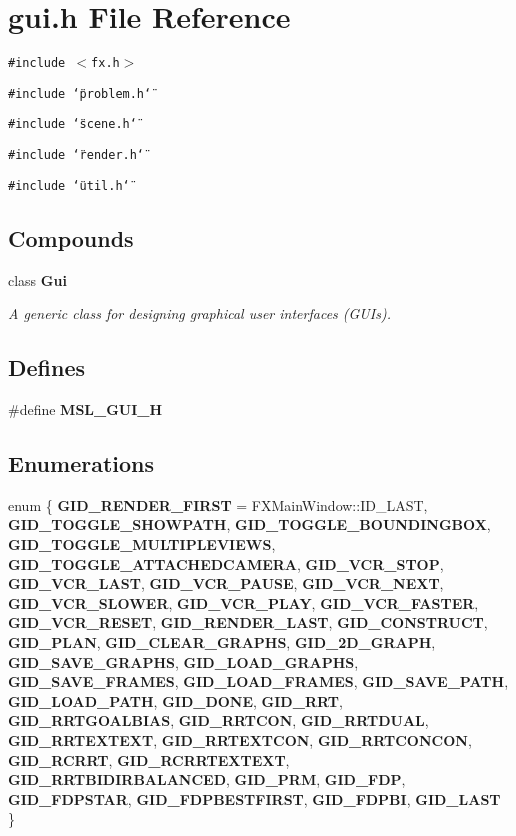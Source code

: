 \section{gui.h File Reference}
\label{gui_8h}
{\tt \#include $<$fx.h$>$}\par
{\tt \#include \char`\"{}problem.h\char`\"{}}\par
{\tt \#include \char`\"{}scene.h\char`\"{}}\par
{\tt \#include \char`\"{}render.h\char`\"{}}\par
{\tt \#include \char`\"{}util.h\char`\"{}}\par
\subsection*{Compounds}
\begin{CompactItemize}
\item 
class {\bf Gui}
\begin{CompactList}\small\item\em A generic class for designing graphical user interfaces (GUIs).\item\end{CompactList}\end{CompactItemize}
\subsection*{Defines}
\begin{CompactItemize}
\item 
\#define {\bf MSL\_\-GUI\_\-H}
\end{CompactItemize}
\subsection*{Enumerations}
\begin{CompactItemize}
\item 
enum \{ {\bf GID\_\-RENDER\_\-FIRST} =  FXMain\-Window::ID\_\-LAST, 
{\bf GID\_\-TOGGLE\_\-SHOWPATH}, 
{\bf GID\_\-TOGGLE\_\-BOUNDINGBOX}, 
{\bf GID\_\-TOGGLE\_\-MULTIPLEVIEWS}, 
{\bf GID\_\-TOGGLE\_\-ATTACHEDCAMERA}, 
{\bf GID\_\-VCR\_\-STOP}, 
{\bf GID\_\-VCR\_\-LAST}, 
{\bf GID\_\-VCR\_\-PAUSE}, 
{\bf GID\_\-VCR\_\-NEXT}, 
{\bf GID\_\-VCR\_\-SLOWER}, 
{\bf GID\_\-VCR\_\-PLAY}, 
{\bf GID\_\-VCR\_\-FASTER}, 
{\bf GID\_\-VCR\_\-RESET}, 
{\bf GID\_\-RENDER\_\-LAST}, 
{\bf GID\_\-CONSTRUCT}, 
{\bf GID\_\-PLAN}, 
{\bf GID\_\-CLEAR\_\-GRAPHS}, 
{\bf GID\_\-2D\_\-GRAPH}, 
{\bf GID\_\-SAVE\_\-GRAPHS}, 
{\bf GID\_\-LOAD\_\-GRAPHS}, 
{\bf GID\_\-SAVE\_\-FRAMES}, 
{\bf GID\_\-LOAD\_\-FRAMES}, 
{\bf GID\_\-SAVE\_\-PATH}, 
{\bf GID\_\-LOAD\_\-PATH}, 
{\bf GID\_\-DONE}, 
{\bf GID\_\-RRT}, 
{\bf GID\_\-RRTGOALBIAS}, 
{\bf GID\_\-RRTCON}, 
{\bf GID\_\-RRTDUAL}, 
{\bf GID\_\-RRTEXTEXT}, 
{\bf GID\_\-RRTEXTCON}, 
{\bf GID\_\-RRTCONCON}, 
{\bf GID\_\-RCRRT}, 
{\bf GID\_\-RCRRTEXTEXT}, 
{\bf GID\_\-RRTBIDIRBALANCED}, 
{\bf GID\_\-PRM}, 
{\bf GID\_\-FDP}, 
{\bf GID\_\-FDPSTAR}, 
{\bf GID\_\-FDPBESTFIRST}, 
{\bf GID\_\-FDPBI}, 
{\bf GID\_\-LAST}
 \}
\end{CompactItemize}


